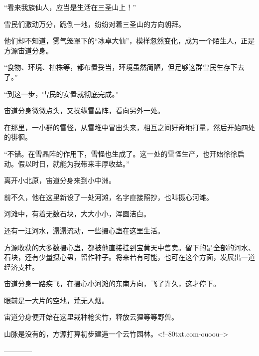\begin{this_body}
“看来我族仙人，应当是生活在三圣山上！”

雪民们激动万分，跪倒一地，纷纷对着三圣山的方向朝拜。

他们却不知道，雾气笼罩下的“冰卓大仙”，模样忽然变化，成为一个陌生人，正是方源宙道分身。

“食物、环境、植株等，都布置妥当，环境虽然简陋，但足够这群雪民生存下去了。”

“到这一步，雪民的安置就彻底完成。”

宙道分身微微点头，又操纵雪晶阵，看向另外一处。

在那里，一小群的雪怪，从雪堆中冒出头来，相互之间好奇地打量，然后开始四处的徘徊。

“不错。在雪晶阵的作用下，雪怪也生成了。这一处的雪怪生产，也开始徐徐启动。假以时日，就能为我带来丰厚收益。”

离开小北原，宙道分身来到小中洲。

前不久，他在这里新设了一处河滩，名字直接照抄，也叫摄心河滩。

河滩中，有着无数石块，大大小小，浑圆洁白。

还有一汪河水，潺潺流动，一些摄心蛊在这里生活。

方源收获的大多数摄心蛊，都被他直接挂到宝黄天中售卖。留下的是全部的河水、石块，还有少量摄心蛊，留作种子。将来若有可能，也可在这个方面，发展出一道经济支柱。

宙道分身一路疾飞，在摄心小河滩的东南方向，飞了许久，这才停下。

眼前是一大片的空地，荒无人烟。

宙道分身便开始在这里栽种枪尖竹，释放云狸等等野兽。

山脉是没有的，方源打算初步建造一个云竹园林。<!--80txt.com-ouoou-->

------------

\end{this_body}

